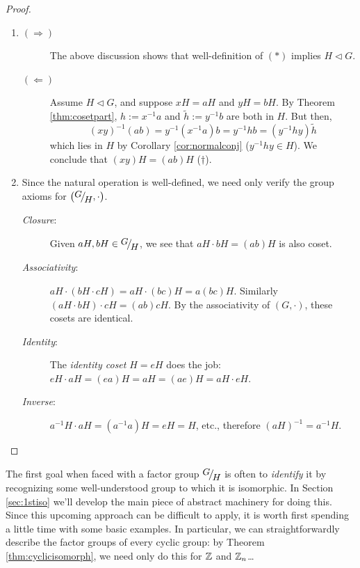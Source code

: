 \begin{proof}
	\begin{enumerate}
	  \item\begin{description}
	  	\item[$(\Rightarrow)$] The above discussion shows that well-definition of $(\ast)$ implies $H\triangleleft G$.
	  	\item[$(\Leftarrow)$] Assume $H\triangleleft G$, and suppose $xH=aH$ and $yH=bH$. By Theorem \ref{thm:cosetpart}, $h:=x^{-1}a$ and $\tilde h:=y^{-1}b$ are both in $H$. But then,
		\[
			(xy)^{-1}(ab)=y^{-1}(x^{-1}a)b =y^{-1}hb =(y^{-1}hy)\tilde h
		\]
		which lies in $H$ by Corollary \ref{cor:normalconj} ($y^{-1}hy\in H$). We conclude that $(xy)H=(ab)H$ ($\dag$).
	  \end{description}
	  \item	Since the natural operation is well-defined, we need only verify the group axioms for $\left(\quotient GH,\cdot\right)$.
		\begin{description}
			\item[\normalfont\emph{Closure}:] Given $aH,bH\in\quotient GH$, we see that $aH\cdot bH=(ab)H$ is also coset.
			\item[\normalfont\emph{Associativity}:] $aH\cdot(bH\cdot cH)=aH\cdot(bc)H=a(bc)H$. Similarly $(aH\cdot bH)\cdot cH=(ab)cH$. By the associativity of $(G,\cdot)$, these cosets are identical.
			\item[\normalfont\emph{Identity}:] The \emph{identity coset} $H=eH$ does the job: $eH\cdot aH=(ea)H=aH=(ae)H=aH\cdot eH$.
			\item[\normalfont\emph{Inverse}:] $a^{-1}H\cdot aH=(a^{-1}a)H=eH=H$, etc., therefore $(aH)^{-1}=a^{-1}H$.\qedhere
		\end{description}
	\end{enumerate}
\end{proof}


\goodbreak



The first goal when faced with a factor group $\quotient GH$ is often to \emph{identify} it by recognizing some well-understood group to which it is isomorphic. In Section \ref{sec:1stiso} we'll develop the main piece of abstract machinery for doing this. Since this upcoming approach can be difficult to apply, it is worth first spending a little time with some basic examples. In particular, we can straightforwardly describe the factor groups of every cyclic group: by Theorem \ref{thm:cyclicisomorph}, we need only do this for $\mathbb{Z}$ and $\mathbb{Z}_n$\ldots\vspace{-5pt}



